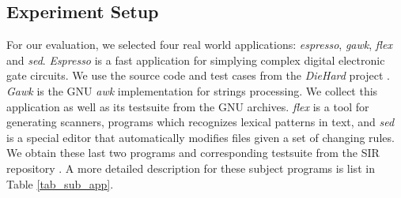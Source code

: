 \subsection{Experiment Setup}


\begin{table}[htbp]
\centering
\caption{Subject applications}
\label{tab_sub_app}
\end{table}

For our evaluation, we selected four real world applications: \emph{espresso}, \emph{gawk}, \emph{flex} and \emph{sed}. \emph{Espresso} is a fast application for simplying complex digital electronic gate circuits. We use the source code and test cases from the \emph{DieHard} project \cite{Berger:2006:DPM:1133255.1134000}. \emph{Gawk} is the GNU \emph{awk} implementation for strings processing. We collect this application as well as its testsuite from the GNU archives. \emph{flex} is a tool for generating scanners, programs which recognizes lexical patterns in text, and \emph{sed} is a special editor that automatically modifies files given a set of changing rules. We obtain these last two programs and corresponding testsuite from the SIR repository \cite{SIR2005}. A more detailed description for these subject programs is list in Table \ref{tab_sub_app}.
%


